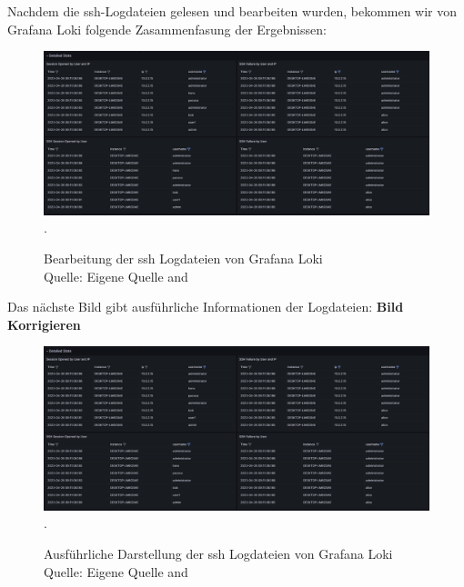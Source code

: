 \newpage
\thispagestyle{lscape}
\begin{landscape}
   Nachdem die \gls{ssh}-Logdateien gelesen und bearbeiten wurden, bekommen wir von Grafana Loki folgende Zasammenfasung der Ergebnissen:
   \begin{center}
      \begin{figure}[H]
         \centering
         \includegraphics[width=1.3\textwidth]{assets/GrafanaLoki_sshDetailed.png}.
         \caption[Bearbeitung der \gls{ssh} Logdateien von Grafana Loki]
         {Bearbeitung der \gls{ssh} Logdateien von Grafana Loki\\Quelle: Eigene Quelle and \citep{VoidQuark_sshlogs}}
         \centering
      \end{figure}
   \end{center}
\end{landscape}

\newpage
\thispagestyle{lscape}
\begin{landscape}
   Das nächste Bild gibt ausführliche Informationen der Logdateien:
   \textbf{Bild Korrigieren}
   \begin{center}
      \begin{figure}[H]
         \centering
         \includegraphics[width=1.3\textwidth]{assets/GrafanaLoki_sshDetailed.png}.
         \caption[Ausführliche Darstellung der \gls{ssh} Logdateien von Grafana Loki]
         {Ausführliche Darstellung der \gls{ssh} Logdateien von Grafana Loki\\Quelle: Eigene Quelle and \citep{VoidQuark_sshlogs}}
         \centering
      \end{figure}
   \end{center}
\end{landscape}


